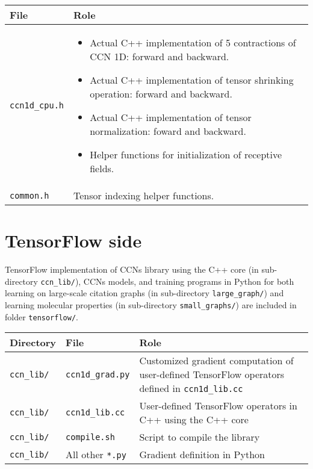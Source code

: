 \documentclass[12pt]{article}
\begin{document}
\begin{center}
\begin{tabular}{| p{} | p{} |}
\hline
File & Role \\
\hline
\texttt{ccn1d\_cpu.h} & 
\begin{itemize}
\item Actual C++ implementation of 5 contractions of CCN 1D: forward and backward.
\item Actual C++ implementation of tensor shrinking operation: forward and backward.
\item Actual C++ implementation of tensor normalization: foward and backward.
\item Helper functions for initialization of receptive fields.
\end{itemize} \\
\hline
\texttt{common.h} & Tensor indexing helper functions. \\
\hline
\end{tabular}
\end{center}

\clearpage

\section{TensorFlow side}

TensorFlow implementation of CCNs library using the C++ core (in sub-directory \texttt{ccn\_lib/}), CCNs models, and training programs in Python for both learning on large-scale citation graphs (in sub-directory \texttt{large\_graph/}) and learning molecular properties (in sub-directory \texttt{small\_graphs/}) are included in folder \texttt{tensorflow/}.

\begin{center}
\begin{tabular}{| p{} | p{} | p{} |}
\hline
Directory & File & Role \\
\hline
\texttt{ccn\_lib/}
&
\texttt{ccn1d\_grad.py}
& 
Customized gradient computation of user-defined TensorFlow operators defined in \texttt{ccn1d\_lib.cc}
\\
\hline
\texttt{ccn\_lib/}
&
\texttt{ccn1d\_lib.cc}
& 
User-defined TensorFlow operators in C++ using the C++ core
\\
\hline
\texttt{ccn\_lib/}
&
\texttt{compile.sh}
& 
Script to compile the library
\\
\hline
\texttt{ccn\_lib/}
&
All other \texttt{*.py}
& 
Gradient definition in Python
\\
\hline
\end{tabular}
\end{center}
\end{document}
